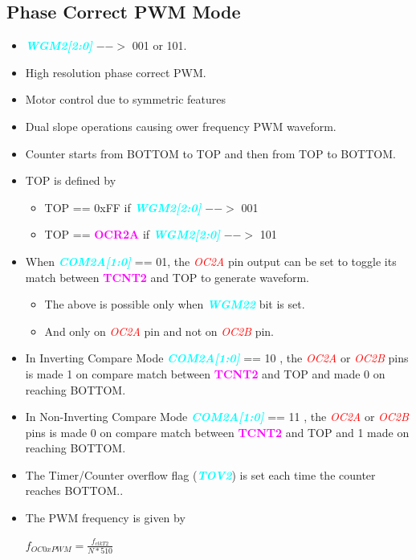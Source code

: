 \documentclass{article}
\newcommand{\bitFormat}[1]{\emph{\textbf{\textcolor{cyan}{#1}}}}
\newcommand{\regFormat}[1]{\textbf{\textcolor{magenta}{#1}}}
\newcommand{\pinFormat}[1]{\emph{\textcolor{red}{#1}}}
\begin{document}
\subsection{Phase Correct PWM Mode}
\begin{itemize}
    \item \bitFormat{WGM2[2:0]} $-->$ 001 or 101.
    \item High resolution phase correct PWM.
    \item Motor control due to symmetric features
    \item Dual slope operations causing ower frequency PWM waveform.
    \item Counter starts from BOTTOM to TOP and then from TOP to BOTTOM.
    \item TOP is defined by
    \begin{itemize}
        \item TOP == 0xFF if \bitFormat{WGM2[2:0]} $-->$ 001
        \item TOP == \regFormat{OCR2A} if \bitFormat{WGM2[2:0]} $-->$ 101
    \end{itemize}
    \item  When \bitFormat{COM2A[1:0]} == 01, the \pinFormat{OC2A} pin output can be set to toggle its match between \regFormat{TCNT2} and TOP to generate waveform.
    \begin{itemize}
        \item The above is possible only when \bitFormat{WGM22} bit is set.
        \item And only on \pinFormat{OC2A} pin and not on \pinFormat{OC2B} pin.
    \end{itemize}
    \item In Inverting Compare Mode \bitFormat{COM2A[1:0]} == 10 , the \pinFormat{OC2A} or \pinFormat{OC2B} pins is made 1 on compare match between \regFormat{TCNT2} and TOP and made 0 on reaching BOTTOM.
    \item In Non-Inverting Compare Mode \bitFormat{COM2A[1:0]} == 11 , the \pinFormat{OC2A} or \pinFormat{OC2B} pins is made 0 on compare match between \regFormat{TCNT2} and TOP and 1 made  on reaching BOTTOM.
    \item The Timer/Counter overflow flag (\bitFormat{TOV2}) is set each time the counter reaches BOTTOM..
    \item The PWM frequency is given by 
    \begin{center}
        { \Large $f_{OC0xPWM} = \frac{f_{clkT2}}{N * 510}$ }
    \end{center}
\end{itemize}
\end{document}
